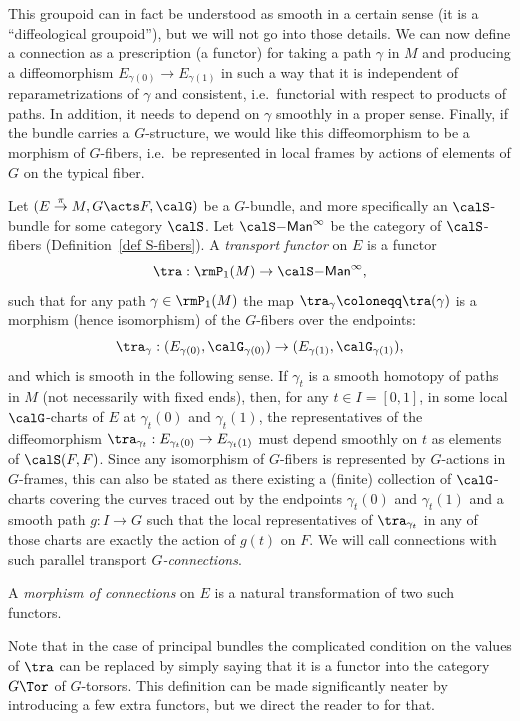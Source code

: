 This groupoid can in fact be understood as smooth in a certain sense (it is a ``diffeological groupoid''), but we will not go into those details. We can now define a connection as a prescription (a functor) for taking a path $\gamma$ in $M$ and producing a diffeomorphism $E_{\gamma(0)}\to E_{\gamma(1)}$ in such a way that it is independent of reparametrizations of $\gamma$ and consistent, i.e.\ functorial with respect to products of paths. In addition, it needs to depend on $\gamma$ smoothly in a proper sense. Finally, if the bundle carries a $G$-structure, we would like this diffeomorphism to be a morphism of $G$-fibers, i.e.\ be represented in local frames by actions of elements of $G$ on the typical fiber.

\begin{defn}
    Let $(E\overset{\pi}{\to}M,G\acts F,\calG)$ be a $G$-bundle, and more specifically an $\calS$-bundle for some category $\calS$. Let $\calS\mathsf{-Man}^\infty$ be the category of $\calS$-fibers (Definition~\ref{def S-fibers}). A \emph{transport functor} on $E$ is a functor
    \[\tra: \rmP_1(M)\to \calS\mathsf{-Man}^\infty,\]
    such that for any path $\gamma\in\rmP_1(M)$ the map $\tra_\gamma\coloneqq \tra(\gamma)$ is a morphism (hence isomorphism) of the $G$-fibers over the endpoints:
    \[\tra_\gamma:(E_{\gamma(0)},\calG_{\gamma(0)})\to (E_{\gamma(1)},\calG_{\gamma(1)}),\]
    and which is smooth in the following sense. If $\gamma_t$ is a smooth homotopy of paths in $M$ (not necessarily with fixed ends), then, for any $t\in I=[0,1]$, in some local $\calG$-charts of $E$ at $\gamma_t(0)$ and $\gamma_t(1)$, the representatives of the diffeomorphism $\tra_{\gamma_t}:E_{\gamma_t(0)}\to E_{\gamma_t(1)}$ must depend smoothly on $t$ as elements of $\calS(F,F)$. Since any isomorphism of $G$-fibers is represented by $G$-actions in $G$-frames, this can also be stated as there existing a (finite) collection of $\calG$-charts covering the curves traced out by the endpoints $\gamma_t(0)$ and $\gamma_t(1)$ and a smooth path $g:I\to G$ such that the local representatives of $\tra_{\gamma_t}$ in any of those charts are exactly the action of $g(t)$ on $F$. We will call connections with such parallel transport \emph{$G$-connections}.

    A \emph{morphism of connections} on $E$ is a natural transformation of two such functors.
\end{defn}

Note that in the case of principal bundles the complicated condition on the values of $\tra$ can be replaced by simply saying that it is a functor into the category $G\Tor$ of $G$-torsors. This definition can be made significantly neater by introducing a few extra functors, but we direct the reader to \cite{schreiber} for that.

